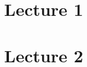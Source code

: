 \documentclass[10pt, draft]{amsbook}
\theoremstyle{teo}
\theoremstyle{dfn}
\theoremstyle{rem}
\begin{document}

\frontmatter




\mainmatter

\chapter{Lecture 1}


\chapter{Lecture 2}



\backmatter



\end{document}
